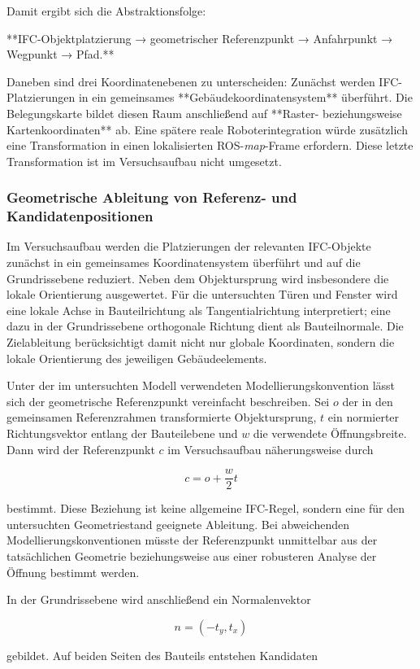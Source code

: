 Damit ergibt sich die Abstraktionsfolge:

**IFC-Objektplatzierung → geometrischer Referenzpunkt → Anfahrpunkt → Wegpunkt → Pfad.**

Daneben sind drei Koordinatenebenen zu unterscheiden: Zunächst werden IFC-Platzierungen in ein
gemeinsames **Gebäudekoordinatensystem** überführt. Die Belegungskarte bildet diesen Raum
anschließend auf **Raster- beziehungsweise Kartenkoordinaten** ab. Eine spätere reale
Roboterintegration würde zusätzlich eine Transformation in einen lokalisierten
ROS-\textit{map}-Frame erfordern. Diese letzte Transformation ist im Versuchsaufbau nicht umgesetzt.

\subsubsection{Geometrische Ableitung von Referenz- und Kandidatenpositionen}
Im Versuchsaufbau werden die Platzierungen der relevanten IFC-Objekte zunächst in ein gemeinsames
Koordinatensystem überführt und auf die Grundrissebene reduziert. Neben dem Objektursprung wird
insbesondere die lokale Orientierung ausgewertet. Für die untersuchten Türen und Fenster wird eine
lokale Achse in Bauteilrichtung als Tangentialrichtung interpretiert; eine dazu in der
Grundrissebene orthogonale Richtung dient als Bauteilnormale. Die Zielableitung berücksichtigt damit
nicht nur globale Koordinaten, sondern die lokale Orientierung des jeweiligen Gebäudeelements.

Unter der im untersuchten Modell verwendeten Modellierungskonvention lässt sich der geometrische
Referenzpunkt vereinfacht beschreiben. Sei \(o\) der in den gemeinsamen Referenzrahmen
transformierte Objektursprung, \(t\) ein normierter Richtungsvektor entlang der Bauteilebene und
\(w\) die verwendete Öffnungsbreite. Dann wird der Referenzpunkt \(c\) im Versuchsaufbau
näherungsweise durch

\[
c = o + \frac{w}{2}t
\]

bestimmt. Diese Beziehung ist keine allgemeine IFC-Regel, sondern eine für den untersuchten
Geometriestand geeignete Ableitung. Bei abweichenden Modellierungskonventionen müsste der
Referenzpunkt unmittelbar aus der tatsächlichen Geometrie beziehungsweise aus einer robusteren
Analyse der Öffnung bestimmt werden.

In der Grundrissebene wird anschließend ein Normalenvektor

\[
n=(-t_y,t_x)
\]

gebildet. Auf beiden Seiten des Bauteils entstehen Kandidaten

